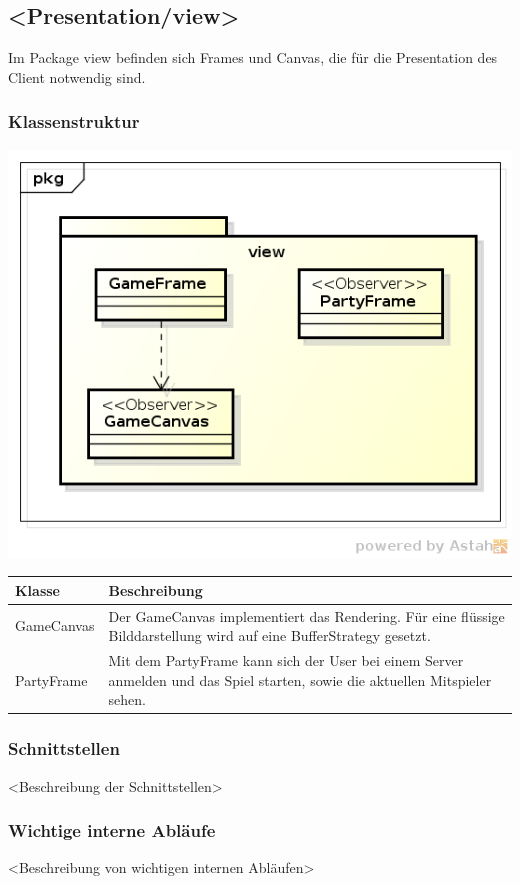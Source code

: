 \documentclass[11pt]{scrartcl}
\begin{document}
\newpage

\subsection{ <Presentation/view>}
Im Package view befinden sich Frames und Canvas, die für die Presentation des Client notwendig sind.


\subsubsection{Klassenstruktur}
\includegraphics[scale=1]{ClassDiagramView}

\begin{tabularx}{\linewidth}{l p{12cm}}
\textbf{Klasse} & \textbf{Beschreibung}\\
\hline
GameCanvas & Der GameCanvas implementiert das Rendering. Für eine flüssige Bilddarstellung wird auf eine BufferStrategy gesetzt.\\
PartyFrame & Mit dem PartyFrame kann sich der User bei einem Server anmelden und das Spiel starten, sowie die aktuellen Mitspieler sehen.
\end{tabularx}

\subsubsection{Schnittstellen}
<Beschreibung der Schnittstellen>
\subsubsection{Wichtige interne Abläufe}
<Beschreibung von wichtigen internen Abläufen>
\end{document}

